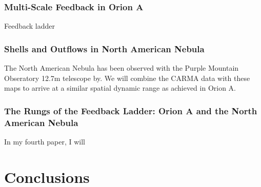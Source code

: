 \subsubsection{Multi-Scale Feedback in Orion A}\label{sec:paper2}
        Feedback ladder
\subsubsection{Shells and Outflows in North American Nebula}\label{sec:paper3}
        The North American Nebula has been observed with the Purple Mountain Obseratory 12.7m telescope by. We will combine the CARMA data with these maps to arrive at a similar spatial dynamic range as achieved in Orion A.
\subsubsection{The Rungs of the Feedback Ladder: Orion A and the North American Nebula}\label{sec:paper4}
        In my fourth paper, I will 
\section{Conclusions}\label{sec:conclusions}
    